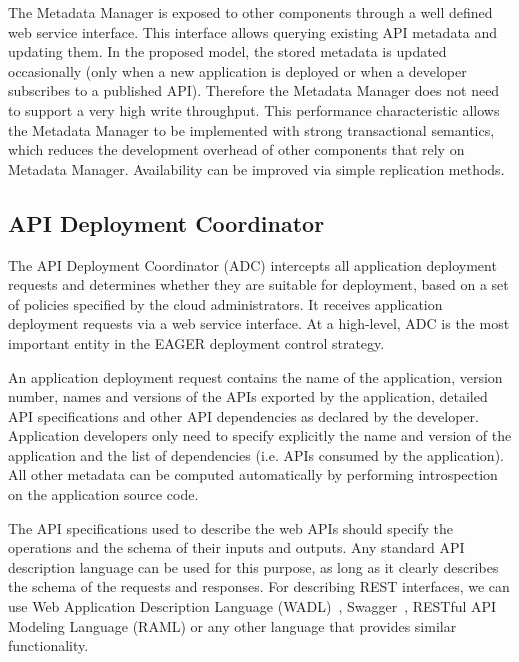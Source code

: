 The Metadata Manager is exposed to other components through a well defined web service interface.
This interface allows querying existing API metadata and updating them. In the proposed model, the stored metadata is updated 
occasionally (only when a new application is deployed or when a developer subscribes to a published API). Therefore the Metadata Manager
does not need to support a very high write throughput. This performance
characteristic allows the Metadata Manager to be implemented with strong 
transactional semantics,
which reduces the development overhead of other components that rely on Metadata Manager. Availability can be improved via
simple replication methods.

\subsection{API Deployment Coordinator} 
\label{sec:adc}
The API Deployment Coordinator (ADC)
intercepts all application deployment requests and determines whether they are
suitable for deployment, based on a set of policies specified by the cloud
administrators. It receives application deployment requests via a web service
interface. At a high-level, ADC is the most important entity in the EAGER deployment
control strategy.

An application deployment request contains the name of the application,
version number, names and versions of the APIs exported by the application,
detailed API specifications and other API dependencies as declared by the
developer. Application developers only need to specify explicitly the name and
version of the application and the list of dependencies (i.e. APIs consumed by
the application). All other metadata can be computed automatically by
performing introspection on the application source code. 

The API specifications used to describe the web APIs should specify the
operations and the schema of their inputs and outputs.  Any standard API
description language can be used for this purpose, as long as it clearly
describes the schema of the requests and responses. For describing REST
interfaces, we can use Web Application Description Language (WADL)~\cite{hl:wadl}, Swagger~\cite{hl:swagger},
RESTful API Modeling Language (RAML) or any other language that provides similar functionality. %

